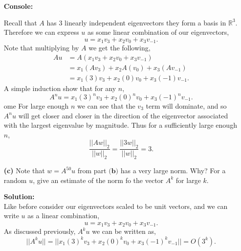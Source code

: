 \documentclass[12pt]{article}
\makeatletter
\theoremstyle{homework}
\newenvironment{exercise}[1]
{\def\@currentlabel{#1}\exercisecore}
{\endexercisecore}
\newcommand{\localhead}[1]{\par\smallskip\noindent\textbf{#1}\nobreak\\}%
\newcommand\solution{\localhead{Solution:}}
\newcommand{\Reals}{\ensuremath{\mathbb R}}
\let\RR\Reals
\makeatother
\begin{document}
\begin{exercise}{Problem P22}
\begin{enumerate}
\textbf{Console:}
\begin{center}
  
\end{center}
Recall that $A$ has 3 linearly independent eigenvectors they form a basis in $\RR^3$. Therefore we can express $u$ as some 
linear combination of our eigenvectors, 
\begin{equation*}
  u = x_1v_3 + x_2v_0 + x_3v_{-1}.
\end{equation*}
Note that multiplying by $A$ we get the following, 
\begin{align*}
  Au &= A(x_1v_3 + x_2v_0 + x_3v_{-1})\\
  &= x_1(Av_3) + x_2A(v_0) + x_3(Av_{-1})\\
  &= x_1(3)v_3 + x_2(0)v_0 + x_3(-1)v_{-1}.
\end{align*}
A simple induction show that for any $n$,
\begin{equation*}
  A^nu =  x_1(3)^nv_3 + x_2(0)^nv_0 + x_3(-1)^nv_{-1}.
\end{equation*}ome
For large enough $n$ we can see that the $v_3$ term will dominate, and so $A^nu$ will get closer and closer 
in the direction of the eigenvector associated with the largest eigenvalue by magnitude. 
Thus for a sufficiently large enough $n$, 
\begin{equation*}
  \frac{||Aw||_2}{||w||_2} =  \frac{||3w||_2}{||w||_2} = 3.
\end{equation*}
\vspace{.15in}


\item[\textbf{(c)}] Note that $w = A^{50}u$ from part $\textbf{(b)}$ has a very large norm. Why?
For a random $u$, give an estimate of the norm fo the vector $A^k$ for large $k$. 
\solution Like before consider our eigenvectors scaled to be unit vectors, and we can write 
$u$ as a linear combination, 
\begin{equation*}
  u = x_1v_3 + x_2v_0 + x_3v_{-1}.
\end{equation*}
As discussed previously, $A^ku$ we can be written as, 
\begin{equation*}
  ||A^ku|| =  ||x_1(3)^kv_3 + x_2(0)^kv_0 + x_3(-1)^kv_{-1}|| = O(3^k).
\end{equation*} 


\end{enumerate}
\end{exercise}
\vspace{1in}
\end{document}
